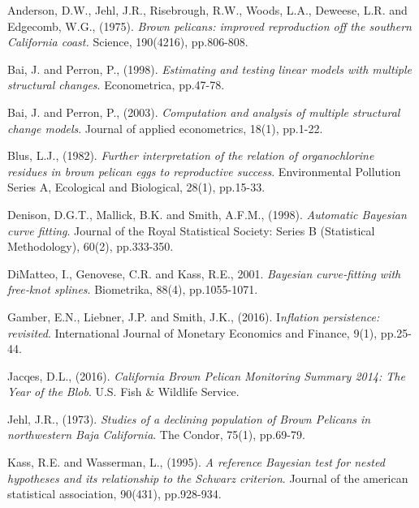 \documentclass[submit]{smj}
\begin{document}
\begin{thebibliography}{99}

Anderson, D.W., Jehl, J.R., Risebrough, R.W., Woods, L.A., Deweese, L.R. and Edgecomb, W.G., (1975). 
\textit{Brown pelicans: improved reproduction off the southern California coast.} Science, 190(4216), pp.806-808.

Bai, J. and Perron, P., (1998).
\textit{Estimating and testing linear models with multiple structural changes}.
Econometrica, pp.47-78.

Bai, J. and Perron, P., (2003).
\textit{ Computation and analysis of multiple structural change models}.
Journal of applied econometrics, 18(1), pp.1-22.

Blus, L.J., (1982). 
\textit{Further interpretation of the relation of organochlorine residues in brown pelican eggs to reproductive success}. 
Environmental Pollution Series A, Ecological and Biological, 28(1), pp.15-33.

Denison, D.G.T., Mallick, B.K. and Smith, A.F.M., (1998). 
\textit{Automatic Bayesian curve fitting}. 
Journal of the Royal Statistical Society: Series B (Statistical Methodology), 60(2), pp.333-350.

DiMatteo, I., Genovese, C.R. and Kass, R.E., 2001. 
\textit{Bayesian curve‐fitting with free‐knot splines}. 
Biometrika, 88(4), pp.1055-1071.

Gamber, E.N., Liebner, J.P. and Smith, J.K., (2016). 
I\textit{nflation persistence: revisited}. 
International Journal of Monetary Economics and Finance, 9(1), pp.25-44.

Jacqes, D.L., (2016). 
\textit{California Brown Pelican Monitoring Summary 2014: The Year of the Blob}. 
U.S. Fish \& Wildlife Service.

Jehl, J.R., (1973). 
\textit{Studies of a declining population of Brown Pelicans in northwestern Baja California}. 
The Condor, 75(1), pp.69-79.

Kass, R.E. and Wasserman, L., (1995). 
\textit{A reference Bayesian test for nested hypotheses and its relationship to the Schwarz criterion}. 
Journal of the american statistical association, 90(431), pp.928-934.


\end{thebibliography}
\end{document}
